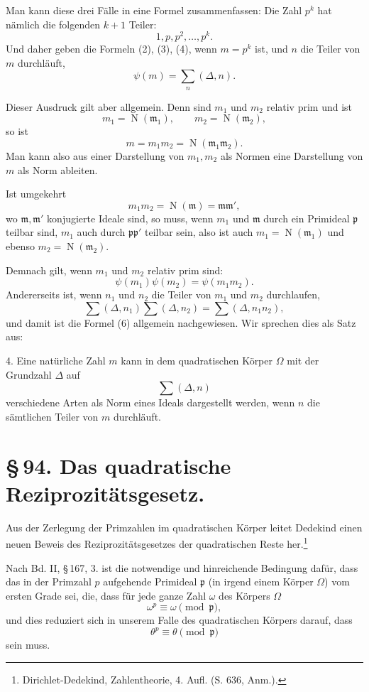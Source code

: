 \documentclass[11pt]{article}
\newcommand{\Norm}{\operatorname{N}}
\begin{document}
Man kann diese drei Fälle in eine Formel zusammenfassen: Die Zahl $p^k$ hat nämlich die folgenden $k+1$ Teiler:
\begin{equation}
1,p,p^2,\ldots,p^k.
\tag{5}
\end{equation}
Und daher geben die Formeln (2), (3), (4), wenn $m=p^k$ ist, und $n$ die Teiler von $m$ durchläuft,
\begin{equation}
 \psi(m)=\sum_n(\Delta,n).
\tag{6}
\end{equation}

Dieser Ausdruck gilt aber allgemein. Denn sind $m_1$ und $m_2$ relativ prim und ist
\[
 m_1=\Norm(\mathfrak m_1),
 \qquad
 m_2=\Norm(\mathfrak m_2),
\]
so ist
\[
 m=m_1m_2=\Norm(\mathfrak m_1\mathfrak m_2).
\]
Man kann also aus einer Darstellung von $m_1,m_2$ als Normen eine Darstellung von $m$ als Norm ableiten.

Ist umgekehrt
\[
 m_1m_2=\Norm(\mathfrak m)=\mathfrak m\mathfrak m',
\]
wo $\mathfrak m,\mathfrak m'$ konjugierte Ideale sind, so muss, wenn $m_1$ und $\mathfrak m$ durch ein Primideal $\mathfrak p$ teilbar sind, $m_1$ auch durch $\mathfrak p\mathfrak p'$ teilbar sein, also ist auch $m_1=\Norm(\mathfrak m_1)$ und ebenso $m_2=\Norm(\mathfrak m_2)$.

Demnach gilt, wenn $m_1$ und $m_2$ relativ prim sind:
\begin{equation}
 \psi(m_1)\psi(m_2)=\psi(m_1m_2).
\tag{7}
\end{equation}
Andererseits ist, wenn $n_1$ und $n_2$ die Teiler von $m_1$ und $m_2$ durchlaufen,
\[
 \sum(\Delta,n_1)\sum(\Delta,n_2)=\sum(\Delta,n_1n_2),
\]
und damit ist die Formel (6) allgemein nachgewiesen. Wir sprechen dies als Satz aus:

4. Eine natürliche Zahl $m$ kann in dem quadratischen Körper $\Omega$ mit der Grundzahl $\Delta$ auf
\[
 \sum(\Delta,n)
\]
verschiedene Arten als Norm eines Ideals dargestellt werden, wenn $n$ die sämtlichen Teiler von $m$ durchläuft.

\section*{\S\,94. Das quadratische Reziprozitätsgesetz.}

Aus der Zerlegung der Primzahlen im quadratischen Körper leitet Dedekind einen neuen Beweis des Reziprozitätsgesetzes der quadratischen Reste her.\footnote{Dirichlet-Dedekind, Zahlentheorie, 4. Aufl. (S. 636, Anm.).}

Nach Bd. II, \S\,167, 3. ist die notwendige und hinreichende Bedingung dafür, dass das in der Primzahl $p$ aufgehende Primideal $\mathfrak p$ (in irgend einem Körper $\Omega$) vom ersten Grade sei, die, dass für jede ganze Zahl $\omega$ des Körpers $\Omega$
\begin{equation}
 \omega^p\equiv\omega\pmod{\mathfrak p},
\tag{1}
\end{equation}
und dies reduziert sich in unserem Falle des quadratischen Körpers darauf, dass
\begin{equation}
 \theta^p\equiv\theta\pmod{\mathfrak p}
\tag{2}
\end{equation}
sein muss.
\end{document}
